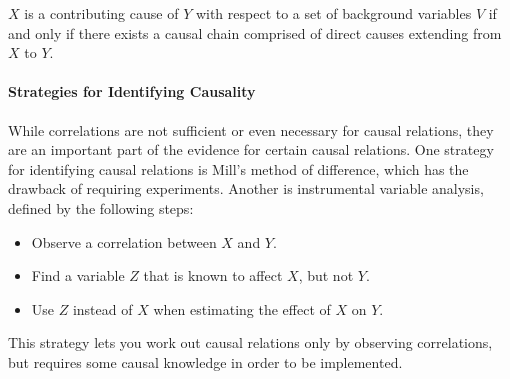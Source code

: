$X$ is a contributing cause of $Y$ with respect to a set of background variables $V$ if and only if there exists a causal chain comprised of direct causes extending from $X$ to $Y$.

\paragraph{Strategies for Identifying Causality}
While correlations are not sufficient or even necessary for causal relations, they are an important part of the evidence for certain causal relations. One strategy for identifying causal relations is Mill's method of difference, which has the drawback of requiring experiments. Another is instrumental variable analysis, defined by the following steps:
\begin{itemize}
	\item Observe a correlation between $X$ and $Y$.
	\item Find a variable $Z$ that is known to affect $X$, but not $Y$.
	\item Use $Z$ instead of $X$ when estimating the effect of $X$ on $Y$.
\end{itemize}
This strategy lets you work out causal relations only by observing correlations, but requires some causal knowledge in order to be implemented.